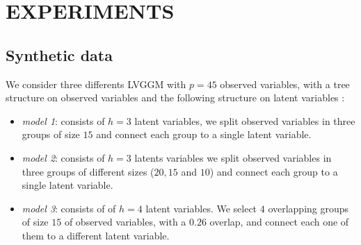 \section{EXPERIMENTS}
\label{experiments}

\subsection{Synthetic data}


We consider three differents LVGGM with $p=45$ observed variables, with a tree structure on observed variables and the following structure on latent variables :
\begin{itemize}
\item \textit{model 1}: consists of $h=3$ latent variables, we split observed variables in three groups of size $15$ and connect each group to a single latent variable.
\item \textit{model 2}: consists of $h=3$ latents variables we split observed variables in three groups of different sizes ($20,15$ and $10$) and connect each group to a single latent variable.
\item \textit{model 3}: consists of of $h=4$ latent variables. We select $4$ overlapping groups of size $15$ of observed variables, with a $0.26$ overlap, and connect each one of them to a different latent variable.
\end{itemize}


